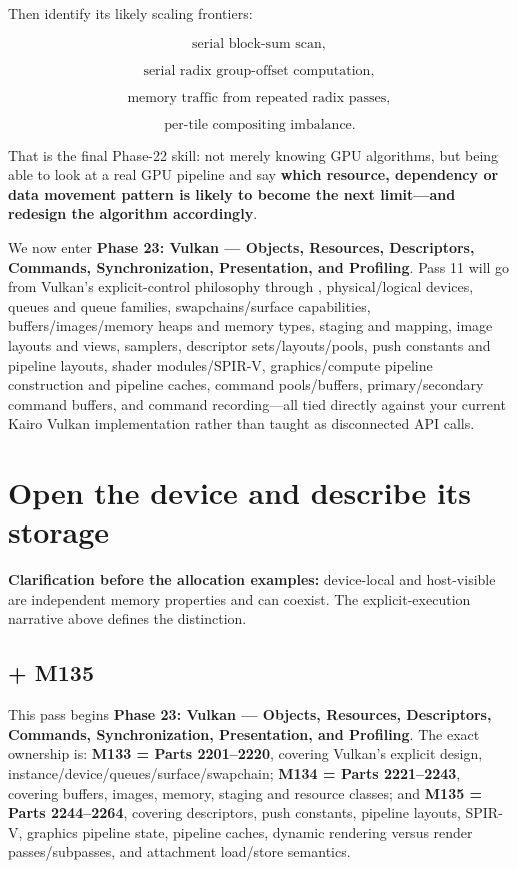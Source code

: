 Then identify its likely scaling frontiers:

\[
\text{serial block-sum scan},
\]

\[
\text{serial radix group-offset computation},
\]

\[
\text{memory traffic from repeated radix passes},
\]

\[
\text{per-tile compositing imbalance}.
\]

That is the final Phase-22 skill: not merely knowing GPU algorithms, but being able to look at a real GPU pipeline and say \textbf{which resource, dependency or data movement pattern is likely to become the next limit---and redesign the algorithm accordingly}.

We now enter \textbf{Phase 23: Vulkan --- Objects, Resources, Descriptors, Commands, Synchronization, Presentation, and Profiling}. Pass 11 will go from Vulkan's explicit-control philosophy through , physical/logical devices, queues and queue families, swapchains/surface capabilities, buffers/images/memory heaps and memory types, staging and mapping, image layouts and views, samplers, descriptor sets/layouts/pools, push constants and pipeline layouts, shader modules/SPIR-V, graphics/compute pipeline construction and pipeline caches, command pools/buffers, primary/secondary command buffers, and command recording---all tied directly against your current Kairo Vulkan implementation rather than taught as disconnected API calls.

\section{Open the device and describe its storage}\label{05-engine-i-ch020-open-the-device-and-describe-its-storage}

\hypertarget{05-engine-i-ch020-open-the-device-and-describe-its-storage}{}

\textbf{Clarification before the allocation examples:} device-local and host-visible are independent memory properties and can coexist. The explicit-execution narrative above defines the distinction.

\subsection{+ M135}\label{05-engine-i-ch020-m135}

\hypertarget{05-engine-i-ch020-m135}{}

This pass begins \textbf{Phase 23: Vulkan --- Objects, Resources, Descriptors, Commands, Synchronization, Presentation, and Profiling}. The exact ownership is: \textbf{M133 = Parts 2201--2220}, covering Vulkan's explicit design, instance/device/queues/surface/swapchain; \textbf{M134 = Parts 2221--2243}, covering buffers, images, memory, staging and resource classes; and \textbf{M135 = Parts 2244--2264}, covering descriptors, push constants, pipeline layouts, SPIR-V, graphics pipeline state, pipeline caches, dynamic rendering versus render passes/subpasses, and attachment load/store semantics.

